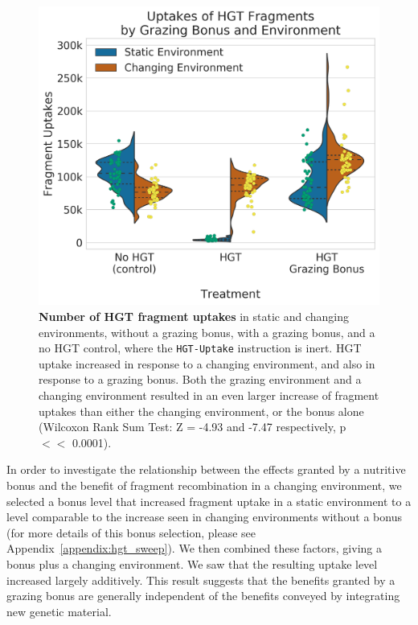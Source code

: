 \documentclass[letterpaper]{article}
\begin{document}
	\begin{figure}[h!]
	\begin{center}
	\includegraphics[width=0.75\columnwidth]{figures/hgt_fragment_uptake.png}
	\caption{ \textbf{Number of HGT fragment uptakes} in static and changing environments, without a grazing bonus, with a grazing bonus, and a no HGT control, where the \texttt{HGT-Uptake} instruction is inert. HGT uptake increased in response to a changing environment, and also in response to a grazing bonus. Both the grazing environment and a changing environment resulted in an even larger increase of fragment uptakes than either the changing environment, or the bonus alone (Wilcoxon Rank Sum Test: Z = -4.93 and -7.47 respectively, p $<<$ 0.0001).
	}\label{fig:hgt_fragment_uptake}
	\end{center}
	\end{figure}

In order to investigate the relationship between the effects granted by a nutritive bonus and the benefit of fragment recombination in a changing environment, we selected a bonus level that increased fragment uptake in a static environment to a level comparable to the increase seen in changing environments without a bonus (for more details of this bonus selection, please see Appendix~\ref{appendix:hgt_sweep}). We then combined these factors, giving a bonus plus a changing environment. We saw that the resulting uptake level increased largely additively. This result suggests that the benefits granted by a grazing bonus are generally independent of the benefits conveyed by integrating new genetic material. 
\end{document}
